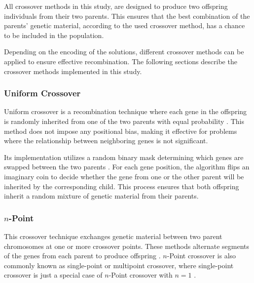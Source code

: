 \documentclass[english,examples]{isasthesis}
\begin{document}
All crossover methods in this study, are designed to produce two offspring
individuals from their two parents. This ensures that the best combination of
the parents' genetic material, according to the used crossover method,
has a chance to be included in the population.

Depending on the encoding of the solutions, different crossover methods can be
applied to ensure effective recombination. The following sections describe the
crossover methods implemented in this study.

\subsubsection{Uniform Crossover}
Uniform crossover is a recombination technique where each gene in the offspring
is randomly inherited from one of the two parents with equal probability
\cite{Affenzeller2009,Katoch2021}.
This method does not impose any positional bias, making it effective for
problems where the relationship between neighboring genes is not significant.

Its implementation utilizes a random binary mask determining which genes are
swapped between the two parents \cite{Katoch2021}.
For each gene position, the algorithm flips an imaginary coin to decide whether
the gene from one or the other parent will be inherited by the corresponding
child. This process ensures that both offspring inherit a random mixture of
genetic material from their parents.

\subsubsection{$n$-Point}
This crossover technique exchanges genetic material
between two parent chromosomes at one or more crossover points. These methods
alternate segments of the genes from each parent to produce offspring
\cite{Affenzeller2009}.
$n$-Point crossover is also commonly known as single-point or multipoint
crossover, where single-point crossover is just a special case of $n$-Point
crossover with $n=1$ \cite{Affenzeller2009}.
\end{document}
